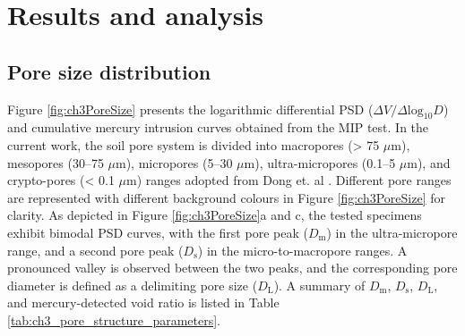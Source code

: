\section{Results and analysis}
\subsection{Pore size distribution}
Figure \ref{fig:ch3PoreSize} presents the logarithmic differential PSD ($\Delta V/\Delta \mathrm{log}_{10}D$) and cumulative mercury intrusion curves obtained from the MIP test. In the current work, the soil pore system is divided into macropores (> 75 $\mu$m), mesopores (30–75 $\mu$m), micropores (5–30 $\mu$m), ultra-micropores (0.1–5 $\mu$m), and crypto-pores (< 0.1 $\mu$m) ranges adopted from Dong et. al \parencite*{dongMicrostructuralInvestigationUnsaturated2024}. Different pore ranges are represented with different background colours in Figure \ref{fig:ch3PoreSize} for clarity. As depicted in Figure \ref{fig:ch3PoreSize}a and c, the tested specimens exhibit bimodal PSD curves, with the first pore peak ($D_{\mathrm{m}}$) in the ultra-micropore range, and a second pore peak ($D_{\mathrm{s}}$) in the micro-to-macropore ranges. A pronounced valley is observed between the two peaks, and the corresponding pore diameter is defined as a delimiting pore size ($D_{\mathrm{L}}$). A summary of $D_{\mathrm{m}}$, $D_{\mathrm{s}}$, $D_{\mathrm{L}}$, and mercury-detected void ratio is listed in Table \ref{tab:ch3_pore_structure_parameters}.
